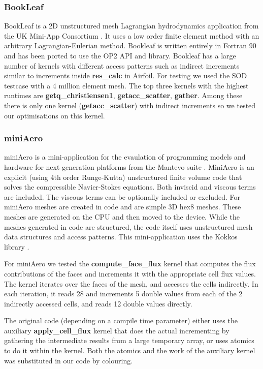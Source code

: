 \subsubsection{BookLeaf}
BookLeaf is a 2D unstructured mesh Lagrangian hydrodynamics application from the
UK Mini-App Consortium \cite{uk-mac}. It uses a low order finite element method
with an arbitrary Lagrangian-Eulerian method.  Bookleaf is written entirely in
Fortran 90 and has been ported to use the OP2 API and library. Bookleaf has a
large number of kernels with different access patterns such as indirect
increments similar to increments inside \textbf{res\_calc} in Airfoil. For
testing we used the SOD testcase with a 4 million element mesh. The top three
kernels with the highest runtimes are \textbf{getq\_christiensen1},
\textbf{getacc\_scatter}, \textbf{gather}. Among these there is only
one kernel (\textbf{getacc\_scatter}) with indirect increments so we tested our
optimisations on this kernel.

\subsubsection{miniAero}\label{sec:mini-aero-summary}

miniAero \cite{miniaero} is a mini-application for the evaulation of programming
models and hardware for next generation platforms from the Mantevo suite
\cite{heroux2009improving}. MiniAero is an explicit (using 4th order
Runge-Kutta) unstructured finite volume code that solves the compressible
Navier-Stokes equations. Both inviscid and viscous terms are included. The
viscous terms can be optionally included or excluded. For miniAero meshes are
created in code and are simple 3D hex8 meshes. These meshes are generated on the
CPU and then moved to the device. While the meshes generated in code are
structured, the code itself uses unstructured mesh data structures and access
patterns. This mini-application uses the Kokkos library
\cite{CarterEdwards20143202}.

For miniAero we tested the \textbf{compute\_face\_flux} kernel that computes the
flux contributions of the faces and increments it with the appropriate cell flux
values. The kernel iterates over the faces of the mesh, and accesses the cells
indirectly. In each iteration, it reads 28 and increments 5 double values from
each of the 2 indirectly accessed cells, and reads 12 double values directly.

The original code (depending on a compile time parameter) either uses the
auxiliary \textbf{apply\_cell\_flux} kernel that does the actual incrementing by
gathering the intermediate results from a large temporary array, or uses atomics
to do it within the kernel. Both the atomics and the work of the auxiliary
kernel was substituted in our code by colouring.

